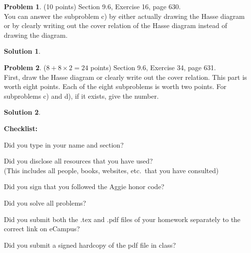 \documentclass{article}
\theoremstyle{definition}
\newtheorem{problem}{Problem}
\newtheorem*{solution}{Solution}
\newcommand{\checklist}{\noindent\textbf{Checklist:}
\begin{compactitem}[$\Box$] 
\item Did you type in your name and section? 
\item Did you disclose all resources that you have used? \\
(This includes all people, books, websites, etc.\ that you have consulted)
\item Did you sign that you followed the Aggie honor code? 
\item Did you solve all problems? 
\item Did you submit both the .tex and .pdf files of your homework separately 
to the correct link on eCampus?
\item Did you submit a signed hardcopy of the pdf file in class? 
\end{compactitem}
}
\begin{document}
\begin{problem} (10 points)
Section 9.6, Exercise 16, page 630.
\ \\
You can answer the subproblem c) by either actually drawing the Hasse diagram 
or by clearly writing out the cover relation of the Hasse diagram instead of 
drawing the diagram.
\end{problem}
\begin{solution} 
\end{solution}

\begin{problem} ($8+8\times 2 = 24$ points)
Section 9.6, Exercise 34, page 631.
\ \\ 
First, draw the Hasse diagram or clearly write out the cover relation.  This
part is worth eight points.  Each of the eight subproblems is worth two points.
For subproblems c) and d), if it exists, give the number.
\end{problem}
\begin{solution} 
\end{solution}

\goodbreak
\checklist
\end{document}
